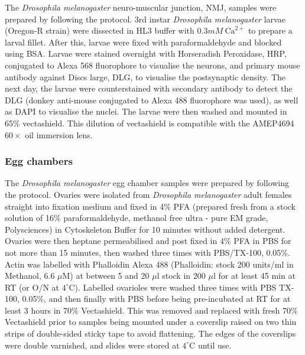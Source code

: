 The \textit{Drosophila melanogaster} neuro-muscular junction, NMJ, 
samples were prepared by following the protocol. 
3rd instar \textit{Drosophila melanogaster} larvae (Oregon-R 
strain) were dissected in HL3 buffer with $0.3mM~\text{Ca}^{2+}$ to 
prepare a larval fillet. After this, larvae were fixed with 
paraformaldehyde and blocked using BSA. Larvae were stained 
overnight with Horseradish Peroxidase, HRP, conjugated to Alexa 568 
fluorophore to visualise the neurons, and primary mouse antibody 
against Discs large, DLG, to visualise the postsynaptic density. 
The next day, the larvae were counterstained with secondary 
antibody to detect the DLG (donkey anti-mouse conjugated to 
Alexa 488 fluorophore was used), as well as DAPI to visualise the 
nuclei. The larvae were then washed and mounted in 65\% 
vectashield.\cite{brent2009drosophila} This dilution of 
vectashield is compatible with the AMEP4694 $60\times$ oil 
immersion lens.

\subsubsection{Egg chambers}
\label{subsubsec:Aurox_Egg_chambers_prep}

The \textit{Drosophila melanogaster} egg chamber samples were 
prepared by following the protocol. Ovaries were isolated from 
\textit{Drosophila melanogaster} adult females straight into fixation 
medium and fixed in 4\% PFA (prepared fresh from a stock solution 
of 16\% paraformaldehyde, methanol free ultra - pure EM grade, 
Polysciences) in Cytoskeleton Buffer for 10 minutes without added 
detergent.\cite{jia2016automatic,zhang2020nanoscale,leyton2016pfa} 
Ovaries were then heptane permeabilised and post fixed in 4\% PFA 
in PBS for not more than 15 minutes, then washed three times with 
PBS/TX-100, 0.05\%. Actin was labelled with Phalloidin Alexa 488 
(Phalloidin: stock 200 units/ml in Methanol, 6.6 $\mu$M) at between 
5 and 20 $\mu$l stock in 200 $\mu$l for at least 45 min at RT (or 
O/N at $4^{\circ}$C). Labelled ovarioles were washed three times with 
PBS TX-100, 0.05\%, and then finally with PBS before being 
pre-incubated at RT for at least 3 hours in 70\% Vectashield. This 
was removed and replaced with fresh 70\% Vectashield prior to samples 
being mounted under a coverslip raised on two thin strips of 
double-sided sticky tape to avoid flattening.\cite{davidson2016localized} 
The edges of the coverslips were double varnished, and slides were stored 
at $4^{\circ}$C until use.
	
